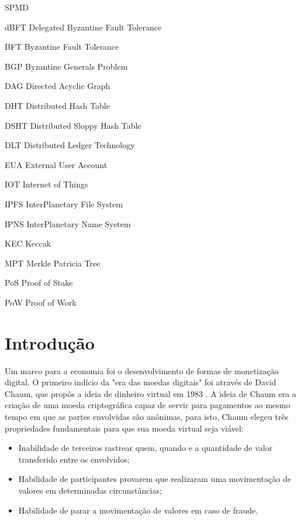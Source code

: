 \documentclass[tcc,capa]{texufpel}
\begin{document}
\listoffigures

\listoftables

\begin{listofabbrv}{SPMD}
    \item[dBFT] Delegated Byzantine Fault Tolerance
    \item[BFT] Byzantine Fault Tolerance
    \item[BGP] Byzantine Generals Problem
    \item[DAG] Directed Acyclic Graph
    \item[DHT] Distributed Hash Table
    \item[DSHT] Distributed Sloppy Hash Table 
    \item[DLT] Distributed Ledger Technology
    \item[EUA] External User Account 
    \item[IOT] Internet of Things
    \item[IPFS] InterPlanetary File System
    \item[IPNS] InterPlanetary Name System
    \item[KEC] Keccak
    \item[MPT] Merkle Patricia Tree
    \item[PoS] Proof of Stake
    \item[PoW] Proof of Work
\end{listofabbrv}

\tableofcontents

\chapter{Introdução}\label{chap:introducao}

    Um marco para a economia foi o desenvolvimento de formas de monetização digital. O primeiro indício da "era das moedas digitais" foi através de David Chaum, que propôs a ideia de dinheiro virtual em 1983 \cite{chaum1983blind}. A ideia de Chaum era a criação de uma moeda criptográfica capaz de servir para pagamentos ao mesmo tempo em que as partes envolvidas são anônimas, para isto, Chaum elegeu três propriedades fundamentais para que sua moeda virtual seja viável: 
	
	\begin{itemize}
	    \item Inabilidade de terceiros rastrear quem, quando e a quantidade de valor transferido entre os envolvidos;
	    \item Habilidade de participantes provarem que realizaram uma movimentação de valores em determinadas circunstâncias;
	    \item Habilidade de parar a movimentação de valores em caso de fraude.
	\end{itemize}
	
\end{document}
